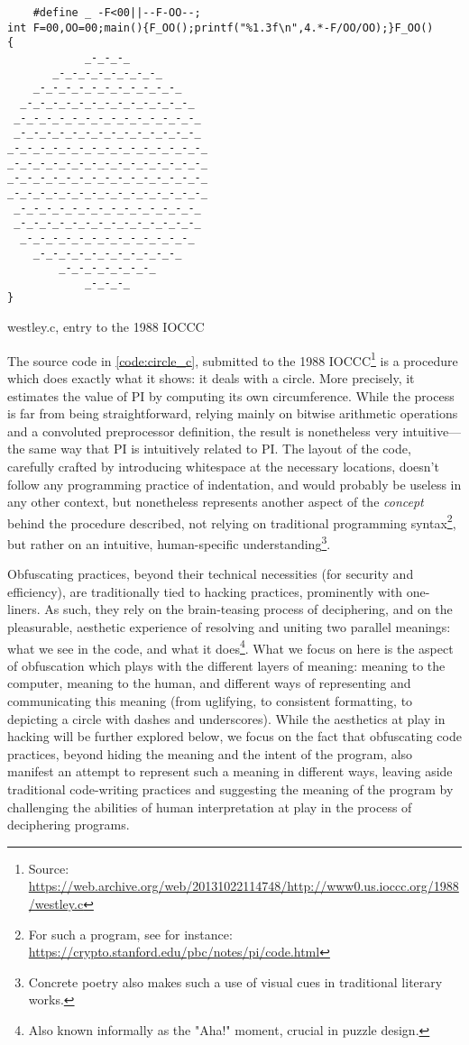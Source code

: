 \begin{listing}
  \begin{verbatim}
    #define _ -F<00||--F-OO--;
int F=00,OO=00;main(){F_OO();printf("%1.3f\n",4.*-F/OO/OO);}F_OO()
{
            _-_-_-_
       _-_-_-_-_-_-_-_-_
    _-_-_-_-_-_-_-_-_-_-_-_
  _-_-_-_-_-_-_-_-_-_-_-_-_-_
 _-_-_-_-_-_-_-_-_-_-_-_-_-_-_
 _-_-_-_-_-_-_-_-_-_-_-_-_-_-_
_-_-_-_-_-_-_-_-_-_-_-_-_-_-_-_
_-_-_-_-_-_-_-_-_-_-_-_-_-_-_-_
_-_-_-_-_-_-_-_-_-_-_-_-_-_-_-_
_-_-_-_-_-_-_-_-_-_-_-_-_-_-_-_
 _-_-_-_-_-_-_-_-_-_-_-_-_-_-_
 _-_-_-_-_-_-_-_-_-_-_-_-_-_-_
  _-_-_-_-_-_-_-_-_-_-_-_-_-_
    _-_-_-_-_-_-_-_-_-_-_-_
        _-_-_-_-_-_-_-_
            _-_-_-_
}
  \end{verbatim}
  \caption{westley.c, entry to the 1988 IOCCC}
  \label{code:circle_c}
\end{listing}

The source code in \ref*{code:circle_c}, submitted to the 1988 IOCCC\footnote{Source: \url{https://web.archive.org/web/20131022114748/http://www0.us.ioccc.org/1988/westley.c}} is a procedure which does exactly what it shows: it deals with a circle. More precisely, it estimates the value of PI by computing its own circumference. While the process is far from being straightforward, relying mainly on bitwise arithmetic operations and a convoluted preprocessor definition, the result is nonetheless very intuitive—the same way that PI is intuitively related to PI. The layout of the code, carefully crafted by introducing whitespace at the necessary locations, doesn't follow any programming practice of indentation, and would probably be useless in any other context, but nonetheless represents another aspect of the \emph{concept} behind the procedure described, not relying on traditional programming syntax\footnote{For such a program, see for instance: \url{https://crypto.stanford.edu/pbc/notes/pi/code.html}}, but rather on an intuitive, human-specific understanding\footnote{Concrete poetry also makes such a use of visual cues in traditional literary works.}.

Obfuscating practices, beyond their technical necessities (for security and efficiency), are traditionally tied to hacking practices, prominently with one-liners. As such, they rely on the brain-teasing process of deciphering, and on the pleasurable, aesthetic experience of resolving and uniting two parallel meanings: what we see in the code, and what it does\footnote{Also known informally as the "Aha!" moment, crucial in puzzle design.}. What we focus on here is the aspect of obfuscation which plays with the different layers of meaning: meaning to the computer, meaning to the human, and different ways of representing and communicating this meaning (from uglifying, to consistent formatting, to depicting a circle with dashes and underscores). While the aesthetics at play in hacking will be further explored below, we focus on the fact that obfuscating code practices, beyond hiding the meaning and the intent of the program, also manifest an attempt to represent such a meaning in different ways, leaving aside traditional code-writing practices and suggesting the meaning of the program by challenging the abilities of human interpretation at play in the process of deciphering programs.


